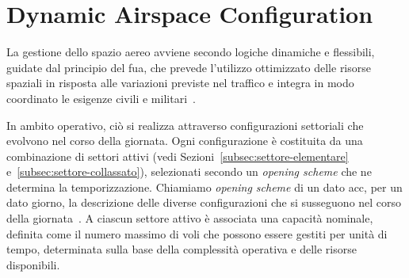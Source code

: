 
\section{Dynamic Airspace Configuration}
La gestione dello spazio aereo avviene secondo logiche dinamiche e flessibili, guidate dal principio del \gls{fua}, che prevede l’utilizzo ottimizzato delle risorse spaziali in risposta alle variazioni previste nel traffico e integra in modo coordinato le esigenze civili e militari~\citep{ec2150_2005,eurocontrol_ans_fua}.

In ambito operativo, ciò si realizza attraverso configurazioni settoriali che evolvono nel corso della giornata. Ogni configurazione è costituita da una combinazione di settori attivi (vedi Sezioni~\ref{subsec:settore-elementare} e~\ref{subsec:settore-collassato}), selezionati secondo un \emph{opening scheme} che ne determina la temporizzazione. Chiamiamo \emph{opening scheme} di un dato \gls{acc}, per un dato giorno, la descrizione delle diverse configurazioni che si susseguono nel corso della giornata~\citep{opscheme1, opscheme2}. A ciascun settore attivo è associata una capacità nominale, definita come il numero massimo di voli che possono essere gestiti per unità di tempo, determinata sulla base della complessità operativa e delle risorse disponibili.

